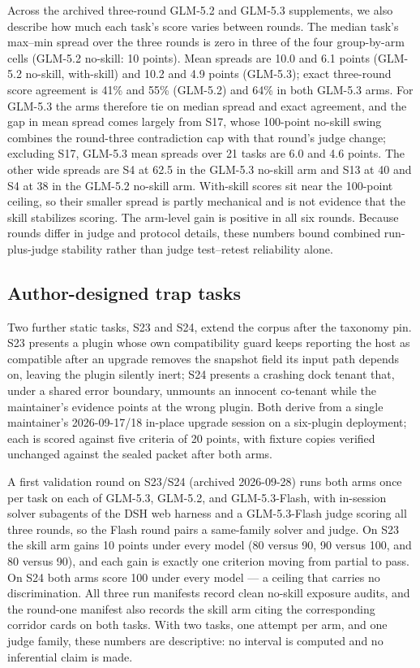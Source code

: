 \documentclass[11pt]{article}
\begin{document}
Across the archived three-round GLM-5.2 and GLM-5.3 supplements, we also describe how much each task's score varies between rounds. The median task's max--min spread over the three rounds is zero in three of the four group-by-arm cells (GLM-5.2 no-skill: 10 points). Mean spreads are 10.0 and 6.1 points (GLM-5.2 no-skill, with-skill) and 10.2 and 4.9 points (GLM-5.3); exact three-round score agreement is 41\% and 55\% (GLM-5.2) and 64\% in both GLM-5.3 arms. For GLM-5.3 the arms therefore tie on median spread and exact agreement, and the gap in mean spread comes largely from S17, whose 100-point no-skill swing combines the round-three contradiction cap with that round's judge change; excluding S17, GLM-5.3 mean spreads over 21 tasks are 6.0 and 4.6 points. The other wide spreads are S4 at 62.5 in the GLM-5.3 no-skill arm and S13 at 40 and S4 at 38 in the GLM-5.2 no-skill arm. With-skill scores sit near the 100-point ceiling, so their smaller spread is partly mechanical and is not evidence that the skill stabilizes scoring. The arm-level gain is positive in all six rounds. Because rounds differ in judge and protocol details, these numbers bound combined run-plus-judge stability rather than judge test--retest reliability alone.

\subsection{Author-designed trap tasks}\label{app:s23s24}
Two further static tasks, S23 and S24, extend the corpus after the taxonomy pin. S23 presents a plugin whose own compatibility guard keeps reporting the host as compatible after an upgrade removes the snapshot field its input path depends on, leaving the plugin silently inert; S24 presents a crashing dock tenant that, under a shared error boundary, unmounts an innocent co-tenant while the maintainer's evidence points at the wrong plugin. Both derive from a single maintainer's 2026-09-17/18 in-place upgrade session on a six-plugin deployment; each is scored against five criteria of 20 points, with fixture copies verified unchanged against the sealed packet after both arms.

A first validation round on S23/S24 (archived 2026-09-28) runs both arms once per task on each of GLM-5.3, GLM-5.2, and GLM-5.3-Flash, with in-session solver subagents of the DSH web harness and a GLM-5.3-Flash judge scoring all three rounds, so the Flash round pairs a same-family solver and judge. On S23 the skill arm gains 10 points under every model (80 versus 90, 90 versus 100, and 80 versus 90), and each gain is exactly one criterion moving from partial to pass. On S24 both arms score 100 under every model --- a ceiling that carries no discrimination. All three run manifests record clean no-skill exposure audits, and the round-one manifest also records the skill arm citing the corresponding corridor cards on both tasks. With two tasks, one attempt per arm, and one judge family, these numbers are descriptive: no interval is computed and no inferential claim is made.
\end{document}
